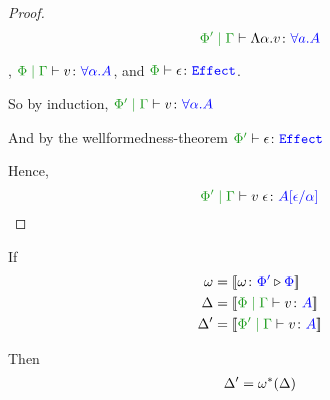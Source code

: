 \documentclass{report}
\begin{document}
\begin{framed}
\begin{proof}
            \begin{equation}
                \gppetyperelation{\elam{\a}{v}}{\all{a}{A}}
            \end{equation}
        
            \case{\vspec}
        
            \bi, $\gpetyperelation{v}{\all{\a}{A}}$, and $\wellformede{\P}{\e}$.
        
            So by induction, $\gppetyperelation{v}{\all{\a}{A}}$
        
            And by the wellformedness-theorem $\wellformede{\P'}{\e}$
        
            Hence, \begin{equation}
                \gppetyperelation{\eapp{v}{\e}}{A\ssub{\a}{\e}}
            \end{equation}
        
    \end{proof}
    
    
\end{framed}
\begin{theorem}
    If 
    \begin{align*}
        \w &= \deno{\wrelw{\P'}{\P}}\\
        \D &= \deno{\gpetyperelation{v}{A}}\\
        \D' &= \deno{\etyperelation{\P'}{\G}{v}{A}}\\
    \end{align*}
    
    Then \begin{eqnarray}
        \Delta' = \omega^*(\Delta)
    \end{eqnarray}
\end{theorem}
\end{document}
